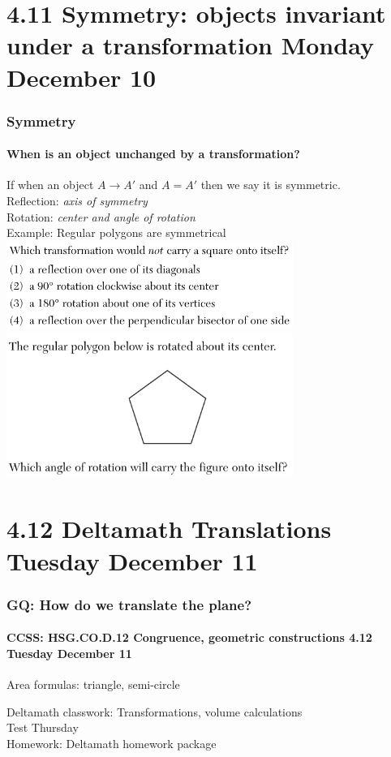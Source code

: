 \documentclass{beamer}
\begin{document}
  \section{4.11 Symmetry: objects invariant under a transformation Monday December 10}
    \frame
    {
      \frametitle{Symmetry}
      \framesubtitle{When is an object unchanged by a transformation?}

      If when an object $A \rightarrow A'$ and $A = A'$ then we say it is symmetric. \\
      Reflection: \emph{axis of symmetry}\\
      Rotation: \emph{center and angle of rotation}\\[0.25cm]
      Example: Regular polygons are symmetrical\\[0.25cm]

      \pause \includegraphics[width=0.7\textwidth]{symmetry-square_JA2018-15.png}\\
      \pause \includegraphics[width=0.7\textwidth]{symmetry_JN2018-19.png}
    }

  \section{4.12 Deltamath Translations Tuesday December 11}
    \frame
    {
      \frametitle{GQ: How do we translate the plane?}
      \framesubtitle{CCSS: HSG.CO.D.12 Congruence, geometric constructions  \alert{4.12 Tuesday December 11}}

      \begin{block}{Area formulas: triangle, semi-circle}
      \end{block}
      Deltamath classwork: Transformations, volume calculations\\[0.5cm]
      \alert{Test Thursday} \\[0.5cm]
      Homework: Deltamath homework package
    }
\end{document}
